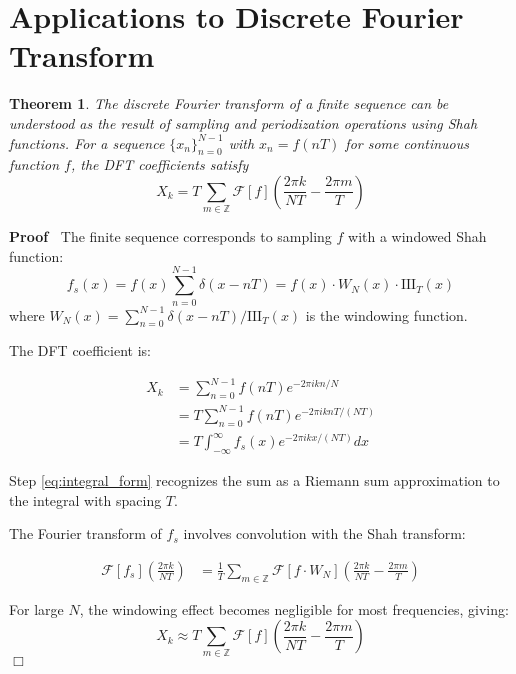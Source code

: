 \documentclass{article}
\newenvironment{proof}{\noindent\textbf{Proof\ }}{\hspace*{\fill}$\Box$\medskip}
\newtheorem{theorem}{Theorem}
\begin{document}
\section{Applications to Discrete Fourier Transform}

\begin{theorem}
  \label{thm:dft_shah_connection}The discrete Fourier transform of a finite
  sequence can be understood as the result of sampling and periodization
  operations using Shah functions. For a sequence $\{x_n \}_{n = 0}^{N - 1}$
  with $x_n = f (nT)$ for some continuous function $f$, the DFT coefficients
  satisfy
  \begin{equation}
    \label{eq:dft_shah} X_k = T \sum_{m \in \mathbb{Z}} \mathcal{F} [f] 
    \left( \frac{2 \pi k}{NT} - \frac{2 \pi m}{T} \right)
  \end{equation}
\end{theorem}

\begin{proof}
  The finite sequence corresponds to sampling $f$ with a windowed Shah
  function:
  \begin{equation}
    \label{eq:windowed_sampling} f_s (x) = f (x)  \sum_{n = 0}^{N - 1} \delta
    (x - nT) = f (x) \cdot W_N (x) \cdot \text{III}_T (x)
  \end{equation}
  where $W_N (x) = \sum_{n = 0}^{N - 1} \delta (x - nT) / \text{III}_T (x)$ is
  the windowing function.
  
  The DFT coefficient is:
  
  \begin{align}
    X_k & = \sum_{n = 0}^{N - 1} f (nT) e^{- 2 \pi ikn / N} 
    \label{eq:dft_definition}\\
    & = T \sum_{n = 0}^{N - 1} f (nT) e^{- 2 \pi iknT / (NT)} 
    \label{eq:factor_T}\\
    & = T \int_{- \infty}^{\infty} f_s (x) e^{- 2 \pi ikx / (NT)} dx 
    \label{eq:integral_form}
  \end{align}
  
  Step \eqref{eq:integral_form} recognizes the sum as a Riemann sum
  approximation to the integral with spacing $T$.
  
  The Fourier transform of $f_s$ involves convolution with the Shah transform:
  
  \begin{align}
    \mathcal{F} [f_s] \left( \frac{2 \pi k}{NT} \right) & = \frac{1}{T} 
    \sum_{m \in \mathbb{Z}} \mathcal{F} [f \cdot W_N]  \left( \frac{2 \pi
    k}{NT} - \frac{2 \pi m}{T} \right)  \label{eq:sampling_effect}
  \end{align}
  
  For large $N$, the windowing effect becomes negligible for most frequencies,
  giving:
  \begin{equation}
    \label{eq:asymptotic_dft} X_k \approx T \sum_{m \in \mathbb{Z}}
    \mathcal{F} [f]  \left( \frac{2 \pi k}{NT} - \frac{2 \pi m}{T} \right)
  \end{equation}
\end{proof}
\end{document}
